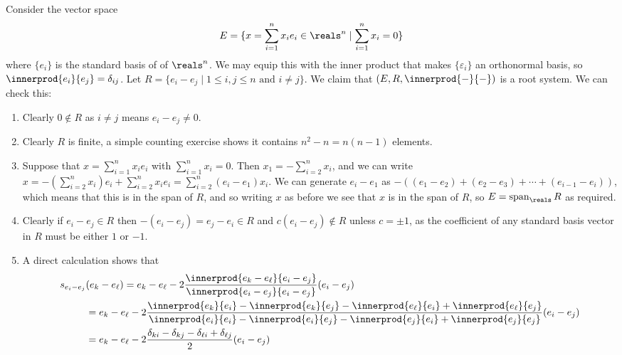 \documentclass[fleqn]{NotesClass}
\DeclareMathOperator{\Span}{span}
\begin{document}
    \begin{exm}{}{}
        Consider the vector space
        \begin{equation}
            E = \{x = \sum_{i=1}^{n} x_i e_i \in \reals^{n} \mid \sum_{i=1}^{n} x_i = 0\}
        \end{equation}
        where \(\{e_i\}\) is the standard basis of  of \(\reals^{n}\).
        We may equip this with the inner product that makes \(\{\varepsilon_i\}\) an orthonormal basis, so \(\innerprod{e_i}{e_j} = \delta_{ij}\).
        Let \(R = \{e_i - e_j \mid 1 \le i , j \le n \text{ and } i \ne j\}\).
        We claim that \((E, R, \innerprod{-}{-})\) is a root system.
        We can check this:
        \begin{enumerate}
            \item Clearly \(0 \notin R\) as \(i \ne j\) means \(e_i - e_j \ne 0\).
            \item Clearly \(R\) is finite, a simple counting exercise shows it contains \(n^2 - n = n(n - 1)\) elements.
            \item Suppose that \(x = \sum_{i=1}^n x_i e_i\) with \(\sum_{i=1}^n x_i = 0\).
            Then \(x_1 = -\sum_{i=2}^n x_i\), and we can write \(x = -\left( \sum_{i=2}^n x_i \right) e_i + \sum_{i=2}^n x_i e_i = \sum_{i=2}^{n} (e_i - e_1)x_i\).
            We can generate \(e_i - e_1\) as \(-((e_1 - e_2) + (e_2 - e_3) + \dotsb + (e_{i-1} - e_i))\), which means that this is in the span of \(R\), and so writing \(x\) as before we see that \(x\) is in the span of \(R\), so \(E = \Span_{\reals}R\) as required.
            \item Clearly if \(e_i - e_j \in R\) then \(-(e_i - e_j) = e_j - e_i \in R\) and \(c(e_i - e_j) \notin R\) unless \(c = \pm 1\), as the coefficient of any standard basis vector in \(R\) must be either \(1\) or \(-1\).
            \item A direct calculation shows that
            \begin{align}
                s_{e_i - e_j}&(e_k - e_{\ell}) = e_k - e_{\ell} - 2\frac{\innerprod{e_k - e_{\ell}}{e_i - e_j}}{\innerprod{e_i - e_j}{e_i - e_j}}(e_i - e_j)\\
                &= e_k - e_{\ell} -2 \frac{\innerprod{e_k}{e_i} - \innerprod{e_k}{e_j} - \innerprod{e_{\ell}}{e_i} + \innerprod{e_{\ell}}{e_j}}{\innerprod{e_i}{e_i} - \innerprod{e_i}{e_j} - \innerprod{e_j}{e_i} + \innerprod{e_j}{e_j}}(e_i - e_j) \notag\\
                &= e_k - e_{\ell} - 2 \frac{\delta_{ki} - \delta_{kj} - \delta_{\ell i} + \delta_{\ell j}}{2}(e_i - e_j)\\

\end{align}
\end{enumerate}
\end{exm}
\end{document}

